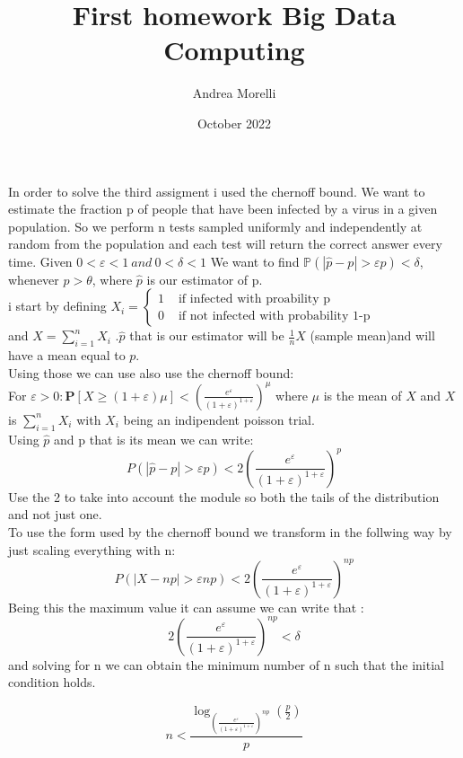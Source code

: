\documentclass{article}
\title{First homework Big Data Computing}
\author{Andrea Morelli}
\date{October 2022}
\begin{document}
\maketitle

\section{}

\section{}



\section{}
In order to solve the third assigment i used the chernoff bound.
We want to estimate the fraction p of people that have been infected by a virus in a given population.
So we perform n tests sampled uniformly and independently at random from the population and each test will return the correct answer every time.
Given $0<\varepsilon<1   \ and  \ 0<\delta<1$ We want to find $\mathbb{P}(|\hat{p}-p|>\varepsilon p)<\delta$, whenever $p>\theta$,
where $\hat{p}$ is our estimator of p.\\
i start by defining \( X_{i}=\left\{\begin{array}{ll}1 & \text { if \ infected \ with \ proability \ p} \\ 0 & \text { if\ not \ infected \ with \ probability \ 1-p }\end{array}\right. \)
\\and $X=\sum ^{n}_{i=1}X_{i}$ .$\hat{p}$ that is our estimator will be \( \frac{1}{n} X \) (sample mean)and will have a mean equal to $p$.\\Using those we can use also use the chernoff bound:\\For $\varepsilon>0: \mathbf{P}[X \geq(1+\varepsilon) \mu]<\left(\frac{e^\varepsilon}{(1+\varepsilon)^{1+\varepsilon}}\right)^\mu$ where $\mu$ is the mean of $X$ and $X$ is $\sum ^{n}_{i=1}X_{i}$ with $X_{i}$ being an indipendent poisson trial.\\
Using $\hat{p}$ and p that is its mean we can write:\\
$$
P(|\hat{p}-p|>\varepsilon p)<2\left(\frac{e^\varepsilon}{(1+\varepsilon)^{1+\varepsilon}}\right)^p
$$
Use the 2 to take into account the module so both the tails of the distribution and not just one.\\
To use the form used by the chernoff bound we transform in the follwing way by just scaling everything with n:\\
$$
P(|X-np|>\varepsilon n p)<2\left(\frac{e^\varepsilon}{(1+\varepsilon)^{1+\varepsilon}}\right)^{np}
$$
Being this the maximum value it can assume we can write that :
$$2\left(\frac{e^\varepsilon}{(1+\varepsilon)^{1+\varepsilon}}\right)^{np}<\delta$$ and solving for n we can obtain the minimum number of n such that the initial condition holds.

$$
n<\frac{\log _{\left(\frac{e^\varepsilon}{(1+\varepsilon)^{1+\varepsilon}}\right)^{np}}\left(\frac{p}{2}\right)}{p}
$$




\section{}
\end{document}

